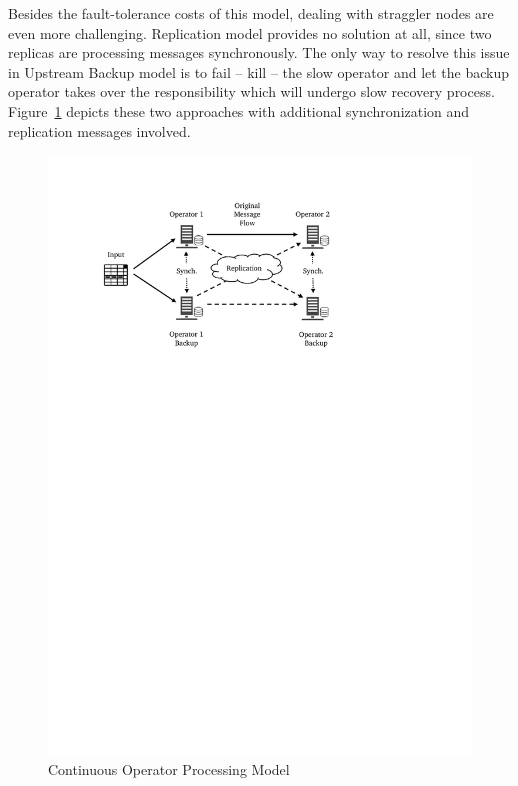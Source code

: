 Besides the fault-tolerance costs of this model, dealing with straggler nodes are even more challenging. Replication model provides no solution at all, since two replicas are processing messages synchronously. The only way to resolve this issue in Upstream Backup model is to fail -- kill -- the slow operator and let the backup operator takes over the responsibility which will undergo slow recovery process. Figure~\ref{fig:sp:cont-op} depicts these two approaches with additional synchronization and replication messages involved.
\begin{figure}[!htbp]
    \centering
    \includegraphics[clip,trim=2.5cm 20cm 6.7cm 2.2cm]{cont-op.pdf}
    \caption[Continuous Operator Processing Model]{Continuous Operator Processing Model\footnotemark}
    \label{fig:sp:cont-op}
\end{figure}

